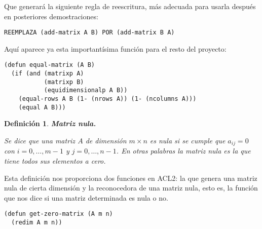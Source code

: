 \documentclass[a4paper,10pt]{article}
\newtheorem{defi}{{Definición}}
\begin{document}
\par \vspace{10pt}		

Que generará la siguiente regla de reescritura, más adecuada para usarla después en posteriores demostraciones:

\par \vspace{10pt}		

\begin{center}
\texttt{REEMPLAZA (add-matrix A B) POR (add-matrix B A)}
\end{center}

\par \vspace{10pt}		

Aquí aparece ya esta importantísima función para el resto del proyecto:

\par \vspace{10pt}		

\begin{lstlisting}[language=clips]
(defun equal-matrix (A B)
  (if (and (matrixp A)
           (matrixp B)
           (equidimensionalp A B))
    (equal-rows A B (1- (nrows A)) (1- (ncolumns A)))
    (equal A B)))
\end{lstlisting}

\par \vspace{12pt}

\begin{defi} \textbf{Matriz nula.}\vspace{8pt}\par
Se dice que una matriz $A$ de dimensión $m \times n$ es \emph{nula} si se cumple que $a_{ij}=0$ con $i = 0, \dots, m-1$ y $j = 0, \dots, n-1$. En otras palabras la matriz nula es la que tiene todos sus elementos a cero.
\end{defi}

\par \vspace{10pt}
			
Esta definición nos proporciona dos funciones en ACL2: la que genera una matriz nula de cierta dimensión y la reconocedora de una matriz nula, esto es, la función que nos dice si una matriz determinada es nula o no.

\par \vspace{10pt}		

\begin{lstlisting}[language=clips]
(defun get-zero-matrix (A m n)
  (redim A m n))
\end{lstlisting}
\end{document}
